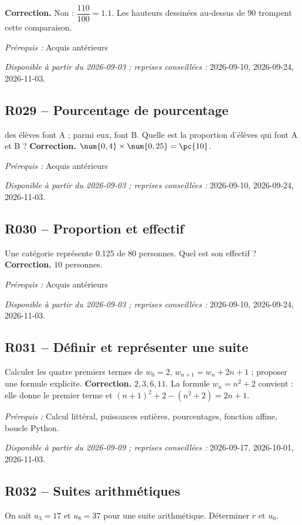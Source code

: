 \ifmxteacher\textbf{Correction.} Non : $\dfrac{110}{100}=\num{1,1}$. Les hauteurs dessinées au-dessus de 90 trompent cette comparaison.\par\textit{Prérequis :} Acquis antérieurs\par\textit{Disponible à partir du 2026-09-03 ; reprises conseillées :} 2026-09-10, 2026-09-24, 2026-11-03.\fi
{}\subsection*{R029 -- Pourcentage de pourcentage}\label{R029}
 des élèves font A ; parmi eux,  font B. Quelle est la proportion d’élèves qui font A et B ?
\ifmxteacher\textbf{Correction.} $\num{0,4}\times\num{0,25}=\pc{10}$.\par\textit{Prérequis :} Acquis antérieurs\par\textit{Disponible à partir du 2026-09-03 ; reprises conseillées :} 2026-09-10, 2026-09-24, 2026-11-03.\fi
{}\subsection*{R030 -- Proportion et effectif}\label{R030}
Une catégorie représente \num{0,125} de 80 personnes. Quel est son effectif ?
\ifmxteacher\textbf{Correction.} $10$ personnes.\par\textit{Prérequis :} Acquis antérieurs\par\textit{Disponible à partir du 2026-09-03 ; reprises conseillées :} 2026-09-10, 2026-09-24, 2026-11-03.\fi
{}\subsection*{R031 -- Définir et représenter une suite}\label{R031}
Calculer les quatre premiers termes de $w_0=2$, $w_{n+1}=w_n+2n+1$ ; proposer une formule explicite.
\ifmxteacher\textbf{Correction.} $2,3,6,11$. La formule $w_n=n^2+2$ convient : elle donne le premier terme et $(n+1)^2+2-(n^2+2)=2n+1$.\par\textit{Prérequis :} Calcul littéral, puissances entières, pourcentages, fonction affine, boucle Python.\par\textit{Disponible à partir du 2026-09-09 ; reprises conseillées :} 2026-09-17, 2026-10-01, 2026-11-03.\fi
{}\subsection*{R032 -- Suites arithmétiques}\label{R032}
On sait $u_3=17$ et $u_8=37$ pour une suite arithmétique. Déterminer $r$ et $u_0$.
